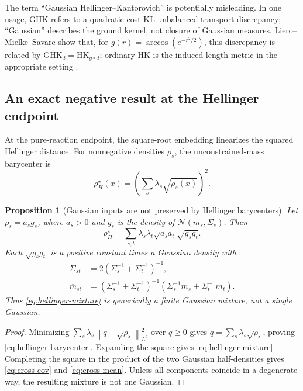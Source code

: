 \documentclass[11pt]{article}
\newtheorem{proposition}[theorem]{Proposition}
\theoremstyle{definition}
\newcommand{\cN}{\mathcal N}
\newcommand{\norm}[1]{\left\lVert #1\right\rVert}
\begin{document}
The term ``Gaussian Hellinger--Kantorovich'' is potentially misleading.  In
one usage, GHK refers to a quadratic-cost KL-unbalanced transport discrepancy;
``Gaussian'' describes the ground kernel, not closure of Gaussian measures.
Liero--Mielke--Savare show that, for
$g(r)=\arccos(e^{-r^2/2})$, this discrepancy is related by
$\mathrm{GHK}_d=\mathrm{HK}_{g\circ d}$; ordinary HK is the induced length
metric in the appropriate setting \cite[Section 7.8]{LieroMielkeSavare2018}.

\subsection{An exact negative result at the Hellinger endpoint}

At the pure-reaction endpoint, the square-root embedding linearizes the
squared Hellinger distance.  For nonnegative densities $\rho_s$, the
unconstrained-mass barycenter is
\begin{equation}\label{eq:hellinger-barycenter}
 \boxed{\rho_H^\star(x)=
 \left(\sum_s\lambda_s\sqrt{\rho_s(x)}\right)^2.}
\end{equation}

\begin{proposition}[Gaussian inputs are not preserved by Hellinger barycenters]
Let $\rho_s=a_sg_s$, where $a_s>0$ and
$g_s$ is the density of $\cN(m_s,\Sigma_s)$.  Then
\begin{equation}\label{eq:hellinger-mixture}
 \rho_H^\star
 =\sum_{s,t}\lambda_s\lambda_t\sqrt{a_sa_t}\sqrt{g_sg_t}.
\end{equation}
Each $\sqrt{g_sg_t}$ is a positive constant times a Gaussian density with
\begin{align}
 \overline\Sigma_{st}&=2(\Sigma_s^{-1}+\Sigma_t^{-1})^{-1},
 \label{eq:cross-cov}\\
 \overline m_{st}&=(\Sigma_s^{-1}+\Sigma_t^{-1})^{-1}
 (\Sigma_s^{-1}m_s+\Sigma_t^{-1}m_t).
 \label{eq:cross-mean}
\end{align}
Thus \eqref{eq:hellinger-mixture} is generically a finite Gaussian mixture,
not a single Gaussian.
\end{proposition}

\begin{proof}
Minimizing
$\sum_s\lambda_s\norm{q-\sqrt{\rho_s}}_{L^2}^2$ over $q\geq0$ gives
$q=\sum_s\lambda_s\sqrt{\rho_s}$, proving
\eqref{eq:hellinger-barycenter}.  Expanding the square gives
\eqref{eq:hellinger-mixture}.  Completing the square in the product of the two
Gaussian half-densities gives \eqref{eq:cross-cov} and
\eqref{eq:cross-mean}.  Unless all components coincide in a degenerate way,
the resulting mixture is not one Gaussian.
\end{proof}
\end{document}
